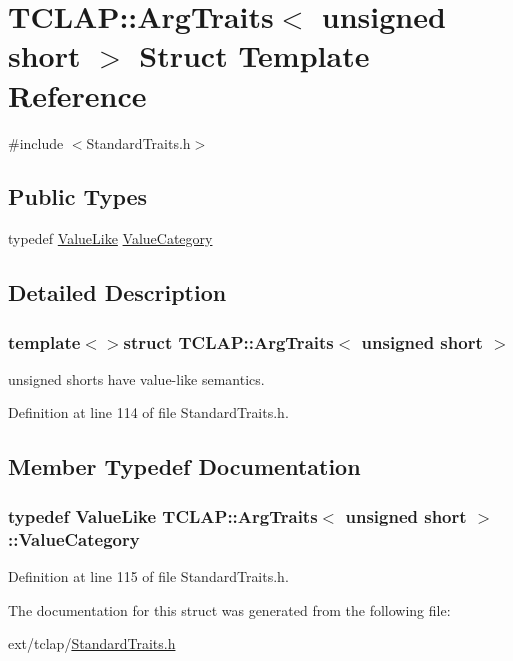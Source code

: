 \hypertarget{struct_t_c_l_a_p_1_1_arg_traits_3_01unsigned_01short_01_4}{}\section{T\+C\+L\+A\+P\+:\+:Arg\+Traits$<$ unsigned short $>$ Struct Template Reference}
\label{struct_t_c_l_a_p_1_1_arg_traits_3_01unsigned_01short_01_4}


{\ttfamily \#include $<$Standard\+Traits.\+h$>$}

\subsection*{Public Types}
\begin{DoxyCompactItemize}
\item 
typedef \hyperlink{struct_t_c_l_a_p_1_1_value_like}{Value\+Like} \hyperlink{struct_t_c_l_a_p_1_1_arg_traits_3_01unsigned_01short_01_4_a0efa2ce53e9cb98dc4a58dda24127d3a}{Value\+Category}
\end{DoxyCompactItemize}


\subsection{Detailed Description}
\subsubsection*{template$<$$>$struct T\+C\+L\+A\+P\+::\+Arg\+Traits$<$ unsigned short $>$}

unsigned shorts have value-\/like semantics. 

Definition at line 114 of file Standard\+Traits.\+h.



\subsection{Member Typedef Documentation}
\hypertarget{struct_t_c_l_a_p_1_1_arg_traits_3_01unsigned_01short_01_4_a0efa2ce53e9cb98dc4a58dda24127d3a}{}
\subsubsection[{Value\+Category}]{\setlength{\rightskip}{0pt plus 5cm}typedef {\bf Value\+Like} {\bf T\+C\+L\+A\+P\+::\+Arg\+Traits}$<$ unsigned short $>$\+::{\bf Value\+Category}}\label{struct_t_c_l_a_p_1_1_arg_traits_3_01unsigned_01short_01_4_a0efa2ce53e9cb98dc4a58dda24127d3a}


Definition at line 115 of file Standard\+Traits.\+h.



The documentation for this struct was generated from the following file\+:\begin{DoxyCompactItemize}
\item 
ext/tclap/\hyperlink{_standard_traits_8h}{Standard\+Traits.\+h}\end{DoxyCompactItemize}
